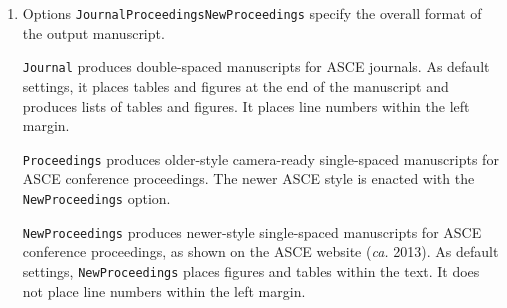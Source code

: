 \documentclass[
  NewProceedings,
  letterpaper]{./assets/ascelike-new}
\begin{document}
\begin{enumerate}
\def\labelenumi{\arabic{enumi}.}
\item
  Options
  \texttt{Journal\textbar{}\textasciigrave{}\textasciigrave{}Proceedings\textbar{}\textasciigrave{}\textasciigrave{}NewProceedings}
  specify the overall format of the output manuscript.

  \texttt{Journal} produces double-spaced manuscripts for ASCE journals.
  As default settings, it places tables and figures at the end of the
  manuscript and produces lists of tables and figures. It places line
  numbers within the left margin.

  \texttt{Proceedings} produces older-style camera-ready single-spaced
  manuscripts for ASCE conference proceedings. The newer ASCE style is
  enacted with the \texttt{NewProceedings} option.

  \texttt{NewProceedings} produces newer-style single-spaced manuscripts
  for ASCE conference proceedings, as shown on the ASCE website
  (\emph{ca.} 2013). As default settings, \texttt{NewProceedings} places
  figures and tables within the text. It does not place line numbers
  within the left margin.


\end{enumerate}
\end{document}
